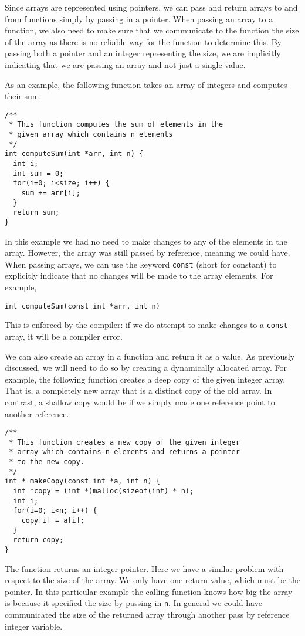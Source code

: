 Since arrays are represented using pointers, we can pass and
return arrays to and from functions simply by passing in a pointer.
When passing an array to a function, we also need to make sure
that we communicate to the function the size of the array as there
is no reliable way for the function to determine this.  By passing
both a pointer and an integer representing the size, we are implicitly
indicating that we are passing an array and not just a single value.

As an example, the following function takes an array of integers
and computes their sum.

\begin{verbatim}
/**
 * This function computes the sum of elements in the
 * given array which contains n elements
 */
int computeSum(int *arr, int n) {
  int i;
  int sum = 0;
  for(i=0; i<size; i++) {
    sum += arr[i];
  }
  return sum;
}
\end{verbatim}

In this example we had no need to make changes to any of the elements
in the array.  However, the array was still passed by reference, meaning
we could have.  When passing arrays, we can use the keyword 
\texttt{const} (short for constant) to explicitly indicate that no changes will be made to the array elements.  For example, 

\texttt{int computeSum(const int *arr, int n)}

This is enforced by the compiler: if we do attempt
to make changes to a \texttt{const} array, it will be a compiler
error.

We can also create an array in a function and return it as 
a value.  As previously discussed, we will need to do so by 
creating a dynamically allocated array.  For example, the 
following function creates a \gls{deep copy} of the given 
integer array.  That is, a completely new array that is a distinct 
copy of the old array.  In contrast, a \gls{shallow copy}
would be if we simply made one reference point to another 
reference.


\begin{verbatim}
/**
 * This function creates a new copy of the given integer
 * array which contains n elements and returns a pointer
 * to the new copy.
 */
int * makeCopy(const int *a, int n) {
  int *copy = (int *)malloc(sizeof(int) * n);
  int i;
  for(i=0; i<n; i++) {
    copy[i] = a[i];
  }
  return copy;
}
\end{verbatim}

The function returns an integer pointer.  Here we have a similar problem
with respect to the size of the array.  We only have one return value, which
must be the pointer.  In this particular example the calling function knows
how big the array is because it specified the size by passing in \texttt{n}. In general we could have communicated the size of the returned array 
through another pass by reference integer variable.

